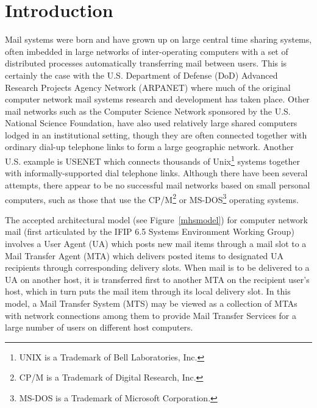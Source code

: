 \newpage\pagestyle{plain}

\section*	{Introduction}
Mail systems were born and have grown up on large central
time sharing systems,
often imbedded in large networks of inter-operating computers with 
a set of distributed processes automatically transferring mail
between users.  
This is certainly the case with the U.S. Department of Defense (DoD) 
Advanced Research Projects Agency Network (ARPANET)
\cite{ARPANET-Literature}
where much of the original computer network mail systems 
research and development has taken place.  
Other mail networks such as the Computer Science Network
\cite{CACM-83}
sponsored by the U.S. National Science Foundation,
have also used relatively large shared computers 
lodged in an institutional setting,
though they are often connected together with ordinary dial-up
telephone links to form a large geographic network.    
Another U.S. example is USENET
\cite{USENET-Literature}
which connects thousands of Unix\footnote{UNIX is
a Trademark of Bell Laboratories, Inc.}
systems together with informally-supported dial telephone links.
Although there have been several attempts, there appear to be no 
successful mail networks based on small personal computers, 
such as those that use the CP/M\footnote{CP/M is a
Trademark of Digital Research, Inc.}
or MS-DOS\footnote{MS-DOS is a Trademark of Microsoft Corporation.}
operating systems.  

The accepted architectural model (see Figure~\ref{mhsmodel})
for computer network mail
(first articulated by the IFIP 6.5 Systems Environment Working Group) 
involves a User Agent (UA) which posts new mail items through a mail slot
\cite{Vittal81,Deutsch81,Pickens81,Kerr81}
to a Mail Transfer Agent (MTA) which delivers posted items 
to designated UA recipients through corresponding delivery slots.  
When mail is to be delivered to a UA on another host, it is transferred
first to another MTA on the recipient user's host, which in turn puts
the mail item through its local delivery slot.  
In this model, a Mail Transfer System (MTS) may be viewed 
as a collection of MTAs with network connections among them 
to provide Mail Transfer Services for a large number of users on 
different host computers.

